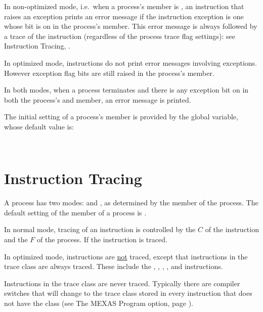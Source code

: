 \documentclass[12pt]{article}
\begin{document}
In non-optimized mode, i.e.~when a process's  member is ,
an instruction that raises an exception prints
an error message if the instruction exception is one whose bit
is on in the process's \label{EXCEPTS-MASK} member.
This error message is always followed by a trace of the instruction
(regardless of the process trace flag settings): see
Instruction Tracing, .

In optimized mode, instructions do not print error messages
involving exceptions.  However exception flag bits are still
raised in the process's  member.

In both modes, when a process terminates and there is any exception
bit on in both the process's 
and  member, an error message is printed.

The initial setting of a process's  member is
provided by the 
global variable, whose default value is:
\begin{center}
 ~~  ~~ 
\end{center}

\section{Instruction Tracing}
\label{INSTRUCTION-TRACING}

A process has two modes:  and , as
determined by the \label{OPTIMIZE} member of the process.
The default setting of the  member of a process
is .

In normal mode, tracing of an instruction
is controlled by the  $C$ of the instruction
and the \label{TRACE-FLAGS} $F$ of the process.  If
 the instruction is traced.

In optimized mode, instructions are \underline{not} traced,
except that instructions in the  trace class are always
traced.  These include the , ,
,
, and  instructions.

Instructions in the  trace class are never
traced.  Typically there are compiler switches that will
change to  the trace class stored in every instruction that
does not have the  class
(see The MEXAS Program  option, page ).
\end{document}
